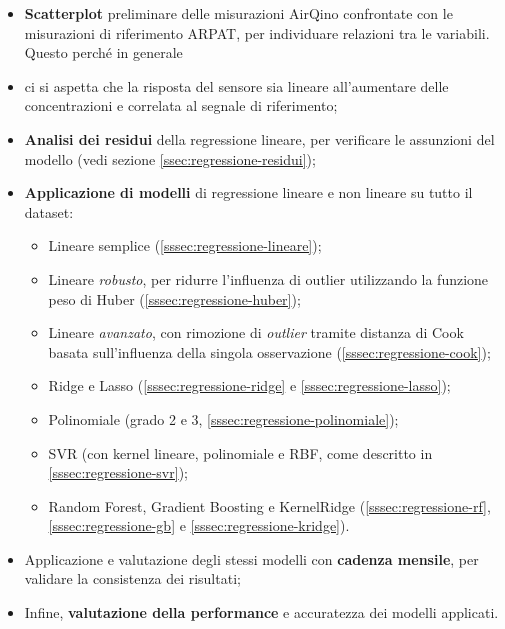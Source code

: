 \begin{itemize}
  \item \textbf{Scatterplot} preliminare delle misurazioni AirQino confrontate con le misurazioni di riferimento ARPAT, per individuare relazioni tra le variabili. Questo perché in generale
  \item  ci si aspetta che la risposta del sensore sia lineare all'aumentare delle concentrazioni e correlata al segnale di riferimento;
  \item \textbf{Analisi dei residui} della regressione lineare, per verificare le assunzioni del modello (vedi sezione \ref{ssec:regressione-residui});
  \item \textbf{Applicazione di modelli} di regressione lineare e non lineare su tutto il dataset:
        \begin{itemize}
          \item Lineare semplice (\ref{sssec:regressione-lineare});
          \item Lineare \textit{robusto}, per ridurre l'influenza di outlier utilizzando la funzione peso di Huber (\ref{sssec:regressione-huber});
          \item Lineare \textit{avanzato}, con rimozione di \textit{outlier} tramite distanza di Cook basata sull'influenza della singola osservazione (\ref{sssec:regressione-cook});
          \item Ridge e Lasso (\ref{sssec:regressione-ridge} e \ref{sssec:regressione-lasso});
          \item Polinomiale (grado 2 e 3, \ref{sssec:regressione-polinomiale});
          \item SVR (con kernel lineare, polinomiale e RBF, come descritto in \ref{sssec:regressione-svr});
          \item Random Forest, Gradient Boosting e KernelRidge (\ref{sssec:regressione-rf}, \ref{sssec:regressione-gb} e \ref{sssec:regressione-kridge}).
        \end{itemize}
    \item Applicazione e valutazione degli stessi modelli con \textbf{cadenza mensile}, per validare la consistenza dei risultati;
    \item Infine, \textbf{valutazione della performance} e accuratezza dei modelli applicati.
\end{itemize}

